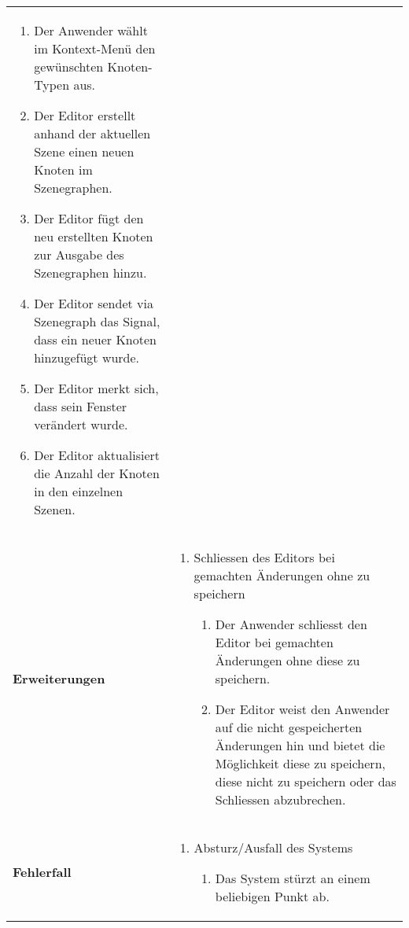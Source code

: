 \begin{longtabu}{p{0.5\textwidth}p{0.5\textwidth}}
\begin{enumerate}
{                    sich.}
            \item{Der Anwender wählt im Kontext-Menü den gewünschten
                    Knoten-Typen aus.}
            \item{Der Editor erstellt anhand der aktuellen Szene einen
                    neuen Knoten im Szenegraphen.}
            \item{Der Editor fügt den neu erstellten Knoten zur Ausgabe des
                    Szenegraphen hinzu.}
            \item{Der Editor sendet via Szenegraph das Signal, dass ein
                    neuer Knoten hinzugefügt wurde.}
            \item{Der Editor merkt sich, dass sein Fenster verändert
                    wurde.}
            \item{Der Editor aktualisiert die Anzahl der Knoten in den
                    einzelnen Szenen.}
        \end{enumerate} \\
    \cmidrule(r){1-1}\cmidrule(lr){2-2}
        \textbf{Erweiterungen} &
        \begin{enumerate}[label= (\alph*)]
            \item{Schliessen des Editors bei gemachten Änderungen ohne zu
                    speichern
                \begin{enumerate}[label= (\roman*)]
                    \item{Der Anwender schliesst den Editor bei gemachten
                            Änderungen ohne diese zu speichern.}
                    \item{Der Editor weist den Anwender auf die
                            nicht gespeicherten Änderungen hin und bietet
                            die Möglichkeit diese zu speichern, diese nicht
                            zu speichern oder das Schliessen abzubrechen.}
                \end{enumerate}
            }
        \end{enumerate}\\
    \cmidrule(r){1-1}\cmidrule(lr){2-2}
        \textbf{Fehlerfall} &
        \begin{enumerate}[label= (\alph*)]
            \item{Absturz/Ausfall des Systems
                \begin{enumerate}[label= (\roman*)]
                        \item{Das System stürzt an einem beliebigen Punkt
                                ab.}

\end{enumerate}}
\end{enumerate}
\end{longtabu}
